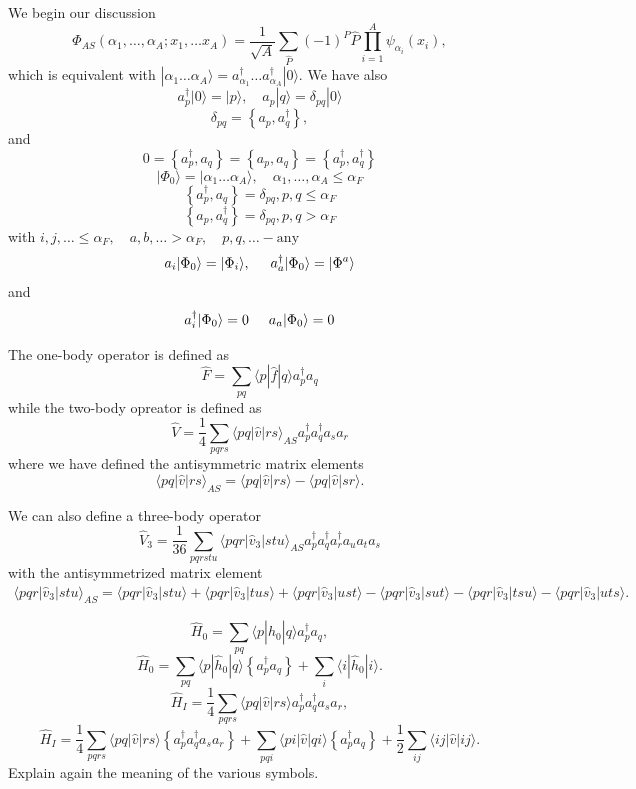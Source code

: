 We begin our discussion
\[
  \Phi_{AS}(\alpha_1, \dots, \alpha_A; x_1, \dots x_A)=
            \frac{1}{\sqrt{A}} \sum_{\hat{P}} (-1)^P \hat{P} \prod_{i=1}^A \psi_{\alpha_i}(x_i),
\]
which is equivalent with $|\alpha_1 \dots \alpha_A\rangle= a_{\alpha_1}^{\dagger} \dots a_{\alpha_A}^{\dagger} |0\rangle$. We have also
    \[
        a_p^\dagger|0\rangle = |p\rangle, \quad a_p |q\rangle = \delta_{pq}|0\rangle
    \]
\[
  \delta_{pq} = \left\{a_p, a_q^\dagger \right\},
\]
and 
\[
0 = \left\{a_p^\dagger, a_q \right\} = \left\{a_p, a_q \right\} = \left\{a_p^\dagger, a_q^\dagger \right\}
\]
\[
|\Phi_0\rangle = |\alpha_1 \dots \alpha_A\rangle, \quad \alpha_1, \dots, \alpha_A \leq \alpha_F
\]
\[
\left\{a_p^\dagger, a_q \right\}= \delta_{pq}, p, q \leq \alpha_F 
\]
\[
\left\{a_p, a_q^\dagger \right\} = \delta_{pq}, p, q > \alpha_F
\]
with         $i,j,\ldots \leq \alpha_F, \quad a,b,\ldots > \alpha_F, \quad p,q, \ldots - \textrm{any}$
\[
        a_i|\Phi_0\rangle = |\Phi_i\rangle, \hspace{0.5cm} a_a^\dagger|\Phi_0\rangle = |\Phi^a\rangle
\]
and         
\[
a_i^\dagger|\Phi_0\rangle = 0 \hspace{0.5cm}  a_a|\Phi_0\rangle = 0
\]




The one-body operator is defined as
\[
 \hat{F} = \sum_{pq} \langle p|\hat{f}|q\rangle a_p^\dagger a_q
\]
while the two-body opreator is defined as
\[
\hat{V} = \frac{1}{4} \sum_{pqrs} \langle pq|\hat{v}|rs\rangle_{AS} a_p^\dagger a_q^\dagger a_s a_r
\]
where we have defined the antisymmetric matrix elements
\[
\langle pq|\hat{v}|rs\rangle_{AS} = \langle pq|\hat{v}|rs\rangle - \langle pq|\hat{v}|sr\rangle.
\]

We can also define a three-body operator
\[
\hat{V}_3 = \frac{1}{36} \sum_{pqrstu} \langle pqr|\hat{v}_3|stu\rangle_{AS} 
                a_p^\dagger a_q^\dagger a_r^\dagger a_u a_t a_s
\]
with the antisymmetrized matrix element
\begin{align}
            \langle pqr|\hat{v}_3|stu\rangle_{AS} = \langle pqr|\hat{v}_3|stu\rangle + \langle pqr|\hat{v}_3|tus\rangle + \langle pqr|\hat{v}_3|ust\rangle- \langle pqr|\hat{v}_3|sut\rangle - \langle pqr|\hat{v}_3|tsu\rangle - \langle pqr|\hat{v}_3|uts\rangle.
\end{align}

\[	     
\hat{H}_0 = \sum_{pq} \langle p|\hat{h}_0|q\rangle a^{\dagger}_p a_q,
\]
\[
\hat{H}_0 = \sum_{pq} \langle p|\hat{h}_0|q\rangle \left\{a^\dagger_p a_q\right\} +
             \sum_i \langle i|\hat{h}_0|i\rangle.
\]
\[
  \hat{H}_I = \frac{1}{4} \sum_{pqrs} \langle pq|\hat{v}|rs\rangle a^\dagger_p a^\dagger_q a_s  a_r,
\]
\[
\hat{H}_I =\frac{1}{4} \sum_{pqrs} \langle pq|\hat{v}|rs\rangle \left\{a^\dagger_p a^\dagger_q a_s  a_r\right\}
            + \sum_{pqi} \langle pi|\hat{v}|qi\rangle \left\{a^\dagger_p a_q\right\} 
            + \frac{1}{2} \sum_{ij}\langle ij|\hat{v}|ij\rangle.
\]
Explain again the meaning of the various symbols.

